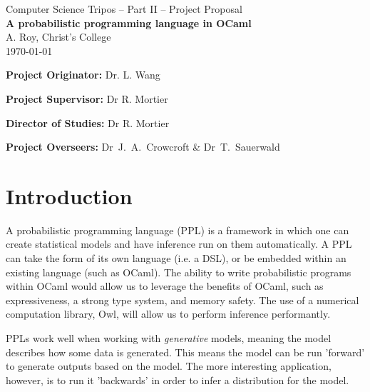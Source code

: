 
\vfil


\begin{center}
      {\Large Computer Science Tripos -- Part II -- Project Proposal} \\
      \vspace{0.4in}
      {\huge \bf A probabilistic programming language in OCaml } \\
      \vspace{0.4in}
      {\large A. Roy, Christ's College} \\
      \vspace{0.1in}
      {\large \today} \\

\end{center}
\vspace{0.4in}

\vfil

\textbf{Project Originator:} Dr. L. Wang
\vspace{0.1in}

\textbf{Project Supervisor:} Dr R. Mortier
\vspace{0.1in}

\textbf{Director of Studies:} Dr R. Mortier
\vspace{0.1in}

\textbf{Project Overseers:} Dr~J.~A.~Crowcroft  \& Dr~T.~Sauerwald

\clearpage


\section*{Introduction}

A probabilistic programming language (PPL) is a framework in which one can create statistical models and have inference run on them automatically. A PPL can take the form of its own language (i.e. a DSL), or be embedded within an existing language (such as OCaml). The ability to write probabilistic programs within OCaml would allow us to leverage the benefits of OCaml, such as expressiveness, a strong type system, and memory safety. The use of a numerical computation library, Owl, will allow us to perform inference performantly.

PPLs work well when working with \textit{generative} models, meaning the model describes how some data is generated. This means the model can be run 'forward' to generate outputs based on the model. The more interesting application, however, is to run it 'backwards' in order to infer a distribution for the model.

